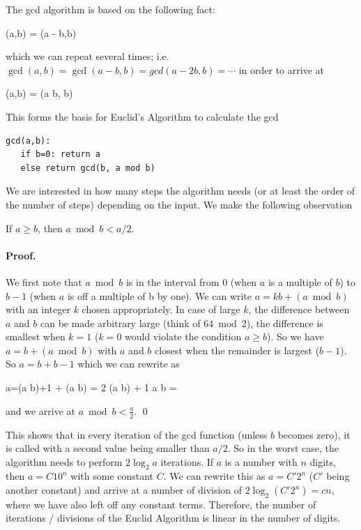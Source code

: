 
The gcd algorithm is based on the following fact:

\bee
\gcd(a,b) = \gcd(a - b,b)
\eee

which we can repeat several times; i.e. $\gcd(a,b) = \gcd(a-b,b) = gcd(a-2b,b) = \cdots$ in order to arrive at

\bee
\gcd(a,b) = \gcd(a \bmod b, b)
\eee

This forms the basis for Euclid's Algorithm to calculate the gcd

\begin{verbatim}
gcd(a,b):
   if b=0: return a
   else return gcd(b, a mod b)
\end{verbatim}

We are interested in how many steps the algorithm needs (or at least the order of the number of steps) depending on the input. We make the following observation

\begin{theorem}
If $a \geq b$, then $a \bmod b < a/2$.
\end{theorem}

\paragraph{Proof.} We first note that $a \bmod b$ is in the interval from $0$ (when $a$ is a multiple of $b$) to $b-1$ (when $a$ is off a multiple of b by one). We can write $a = kb + (a \bmod b)$ with an integer $k$ chosen appropriately. In case of large $k$, the difference between $a$ and $b$ can be made arbitrary large (think of $64 \bmod 2$), the difference is smallest when $k=1$ ($k=0$ would violate the condition $a \geq b$). So we have $a=b + (a \bmod b)$ with $a$ and $b$ closest when the remainder is largest ($b-1$). So $a = b + b-1$ which we can rewrite as 

\bee
a=(a \bmod b)+1 + (a \bmod b) = 2 (a \bmod b) + 1 \rightarrow a \bmod b = 
\eee

and we arrive at $a \bmod b < \frac{a}{2}$. \qed

This shows that in every iteration of the gcd function (unless $b$ becomes zero), it is called with a second value being smaller than $a/2$. So in the worst case, the algorithm needs to perform $2 \log_2 a$ iterations. If $a$ is a number with $n$ digits, then $a = C 10^n$ with some constant $C$. We can rewrite this as $a = C' 2^n$ ($C'$ being another constant) and arrive at a number of division of $2 \log_2 (C' 2^n) = c n$, where we have also left off any constant terms. Therefore, the number of iterations / divisions of the Euclid Algorithm is linear in the number of digits.

